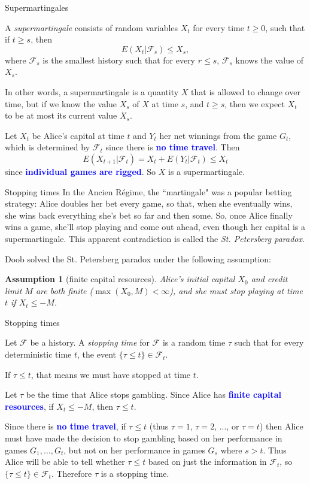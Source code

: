 \documentclass[10pt]{beamer}
\newtheorem{assumption}{Assumption}
\newcommand{\attn}[1]{\textbf{\textcolor{blue}{#1}}}
\begin{document}
\begin{frame}{Supermartingales}
\begin{definition}
A \emph{supermartingale} consists of random variables $X_t$ for every time $t \geq 0$, such that if $t \geq s$, then
$$E(X_t|\mathcal F_s) \leq X_s,$$
where $\mathcal F_s$ is the smallest history such that for every $r \leq s$, $\mathcal F_s$ knows the value of $X_s$.
\end{definition}

In other words, a supermartingale is a quantity $X$ that is allowed to change over time, but if we know the value $X_s$ of $X$ at time $s$, and $t \geq s$, then we expect $X_t$ to be at most its current value $X_s$.

Let $X_t$ be Alice's capital at time $t$ and $Y_t$ her net winnings from the game $G_t$, which is determined by $\mathcal F_t$ since there is \attn{no time travel}. Then
$$E(X_{t + 1}|\mathcal F_t) = X_t + E(Y_t|\mathcal F_t) \leq X_t$$
since \attn{individual games are rigged}. So $X$ is a supermartingale.
\end{frame}

\begin{frame}{Stopping times}
In the Ancien Régime, the ``martingale" was a popular betting strategy: Alice doubles her bet every game, so that, when she eventually wins, she wins back everything she's bet so far and then some.
So, once Alice finally wins a game, she'll stop playing and come out ahead, even though her capital is a supermartingale.
This apparent contradiction is called the \emph{St. Petersberg paradox}.

Doob solved the St. Petersberg paradox under the following assumption:

\begin{assumption}[finite capital resources]
Alice's initial capital $X_0$ and credit limit $M$ are both finite ($\max(X_0, M) < \infty$), and she must stop playing at time $t$ if $X_t \leq -M$.
\end{assumption}
\end{frame}

\begin{frame}{Stopping times}
\begin{definition}
Let $\mathcal F$ be a history.
A \emph{stopping time} for $\mathcal F$ is a random time $\tau$ such that for every deterministic time $t$, the event $\{\tau \leq t\} \in \mathcal F_t$.
\end{definition}
If $\tau \leq t$, that means we must have stopped at time $t$.

Let $\tau$ be the time that Alice stops gambling.
Since Alice has \attn{finite capital resources}, if $X_t \leq -M$, then $\tau \leq t$.

Since there is \attn{no time travel}, if $\tau \leq t$ (thus $\tau = 1$, $\tau = 2$, ..., or $\tau = t$) then Alice must have made the decision to stop gambling based on her performance in games $G_1, \dots, G_t$, but not on her performance in games $G_s$ where $s > t$.
Thus Alice will be able to tell whether $\tau \leq t$ based on just the information in $\mathcal F_t$, so $\{\tau \leq t\} \in \mathcal F_t$.
Therefore $\tau$ is a stopping time.
\end{frame}
\end{document}
